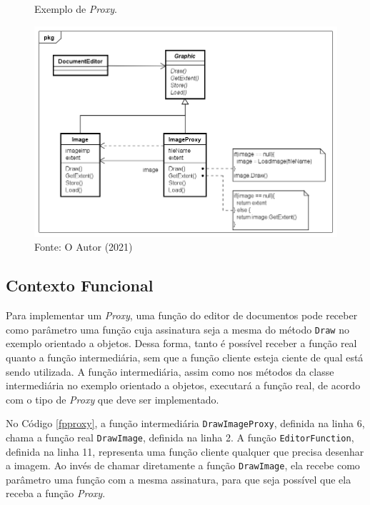 \begin{figure}[htb]
	\caption{\label{proxy_exemplo}Exemplo de \textit{Proxy}.}
	\begin{center}
	    \includegraphics[scale=0.5]{5_padroes-contexto-funcional/5.2_estruturais/5.2.7_proxy/proxy_exemplo.png}
	\end{center}
  \caption*{Fonte: O Autor (2021)}
\end{figure}

\subsection*{Contexto Funcional}

Para implementar um \textit{Proxy}, uma função do 
editor de documentos pode receber como 
parâmetro uma função cuja assinatura seja 
a mesma do método \texttt{Draw} no exemplo orientado 
a objetos. Dessa forma, tanto é possível 
receber a função real quanto a função 
intermediária, sem que a função cliente 
esteja ciente de qual está sendo utilizada. 
A função intermediária, assim como nos 
métodos da classe intermediária no exemplo 
orientado a objetos, executará a função 
real, de acordo com o tipo de \textit{Proxy} que 
deve ser implementado. 

No Código \ref{fpproxy}, a função intermediária 
\texttt{DrawImageProxy}, definida na linha 6, chama a 
função real \texttt{DrawImage}, definida na linha 2. 
A função \texttt{EditorFunction}, definida na linha 11, 
representa uma função cliente qualquer que 
precisa desenhar a imagem. Ao invés de chamar 
diretamente a função \texttt{DrawImage}, ela recebe 
como parâmetro uma função com a mesma assinatura, 
para que seja possível que ela receba a função 
\textit{Proxy}.

